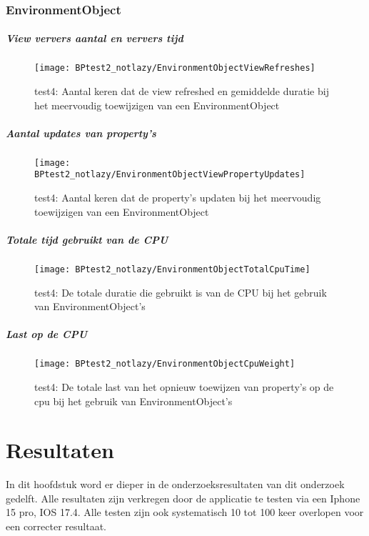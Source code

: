 \subsection{EnvironmentObject}
\paragraph{View ververs aantal en ververs tijd}
\begin{figure}[H]
    \centering
    \texttt{[image: BPtest2\_notlazy/EnvironmentObjectViewRefreshes]} 
    \caption{test4: Aantal keren dat de view refreshed en gemiddelde duratie bij het meervoudig toewijzigen van een EnvironmentObject}
    \label{fig:viewRefreshesEnvironmentObject3}
\end{figure}
\paragraph{Aantal updates van property's}
\begin{figure}[H]
    \centering
    \texttt{[image: BPtest2\_notlazy/EnvironmentObjectViewPropertyUpdates]} 
    \caption{test4: Aantal keren dat de property's updaten bij het meervoudig toewijzigen van een EnvironmentObject}
    \label{fig:propertyUpdatesEnvironmentObject3}
\end{figure}
\paragraph{Totale tijd gebruikt van de CPU}
\begin{figure}[H]
    \centering
    \texttt{[image: BPtest2\_notlazy/EnvironmentObjectTotalCpuTime]} 
    \caption{test4: De totale duratie die gebruikt is van de CPU bij het gebruik van EnvironmentObject's}
    \label{fig:cpuUsageTimeEnvironmentObject3}
\end{figure}
\paragraph{Last op de CPU}
\begin{figure}[H]
    \centering
    \texttt{[image: BPtest2\_notlazy/EnvironmentObjectCpuWeight]} 
    \caption{test4: De totale last van het opnieuw toewijzen van property's op de cpu bij het gebruik van EnvironmentObject's}
    \label{fig:cpuWeightEnvironmentObject3}
\end{figure}

\chapter{Resultaten}%
In dit hoofdstuk word er dieper in de onderzoeksresultaten van dit onderzoek gedelft. Alle resultaten zijn verkregen door de applicatie te testen via een Iphone 15 pro, IOS 17.4. Alle testen zijn ook systematisch 10 tot 100 keer overlopen voor een correcter resultaat. 


